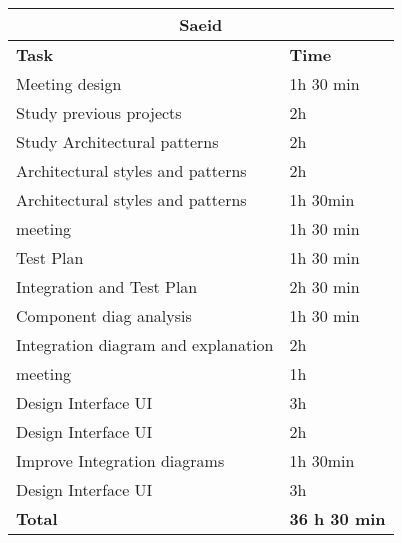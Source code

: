 \begin{table}[H]
\begin{tabular}{|l|l|}
\hline
\multicolumn{2}{|c|}{\textbf{Saeid}}            \\ \hline
\textbf{Task}                   & \textbf{Time} \\ \hline
Meeting design & 1h 30 min \\ \hline
Study previous projects & 2h \\ \hline
Study Architectural  patterns & 2h \\ \hline
Architectural styles and patterns & 2h \\ \hline
Architectural styles and patterns & 1h 30min \\ \hline
meeting & 1h  30 min \\ \hline
Test Plan & 1h  30 min \\ \hline
Integration and Test Plan & 2h  30 min \\ \hline
Component diag analysis & 1h  30 min \\ \hline
Integration diagram and explanation & 2h \\ \hline
meeting & 1h \\ \hline
Design Interface UI & 3h \\ \hline
Design Interface UI & 2h \\ \hline
Improve Integration diagrams & 1h 30min \\ \hline
Design Interface UI & 3h \\ \hline

\rowcolor {polilight}
\textbf{Total}                  & \textbf{36 h 30 min}   \\ \hline
\end{tabular}
\end{table}
